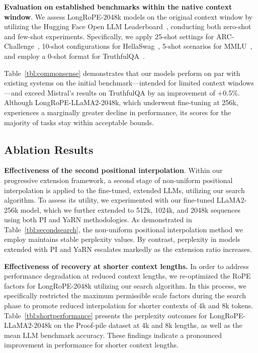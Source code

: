 \textbf{Evaluation on established benchmarks within the native context window}. We assess LongRoPE-2048k models on the original context window by utilizing the Hugging Face Open LLM Leaderboard~\cite{huggingfaceboard}, conducting both zero-shot and few-shot experiments. Specifically, we apply 25-shot settings for ARC-Challenge~\cite{allenai:arc}, 10-shot configurations for HellaSwag~\cite{zellers2019hellaswag}, 5-shot scenarios for MMLU~\cite{mmlu}, and employ a 0-shot format for TruthfulQA~\cite{lin2021truthfulqa}.

Table~\ref{tbl:commonsense} demonstrates that our models perform on par with existing systems on the initial benchmark—intended for limited context windows—and exceed Mistral's results on TruthfulQA by an improvement of +0.5\%. Although LongRoPE-LLaMA2-2048k, which underwent fine-tuning at 256k, experiences a marginally greater decline in performance, its scores for the majority of tasks stay within acceptable bounds.

\subsection{Ablation Results}

\textbf{Effectiveness of the second positional interpolation}. Within our progressive extension framework, a second stage of non-uniform positional interpolation is applied to the fine-tuned, extended LLMs, utilizing our search algorithm. To assess its utility, we experimented with our fine-tuned LLaMA2-256k model, which we further extended to 512k, 1024k, and 2048k sequences using both PI and YaRN methodologies. As demonstrated in Table~\ref{tbl:secondsearch}, the non-uniform positional interpolation method we employ maintains stable perplexity values. By contrast, perplexity in models extended with PI and YaRN escalates markedly as the extension ratio increases.

\textbf{Effectiveness of recovery at shorter context lengths.} In order to address performance degradation at reduced context lengths, we re-optimized the RoPE factors for LongRoPE-2048k utilizing our search algorithm. In this process, we specifically restricted the maximum permissible scale factors during the search phase to promote reduced interpolation for shorter contexts of 4k and 8k tokens. Table~\ref{tbl:shortperformance} presents the perplexity outcomes for LongRoPE-LLaMA2-2048k on the Proof-pile dataset at 4k and 8k lengths, as well as the mean LLM benchmark accuracy. These findings indicate a pronounced improvement in performance for shorter context lengths.

